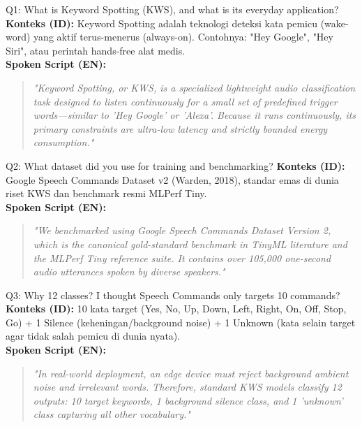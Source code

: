 \documentclass[11pt,a4paper]{article}
\begin{document}
\begin{easybox}{Q1: What is Keyword Spotting (KWS), and what is its everyday application?}
\textbf{Konteks (ID):} Keyword Spotting adalah teknologi deteksi kata pemicu (wake-word) yang aktif terus-menerus (always-on). Contohnya: "Hey Google", "Hey Siri", atau perintah hands-free alat medis.\\
\textbf{Spoken Script (EN):}
\begin{quote}
\small
\textit{"Keyword Spotting, or KWS, is a specialized lightweight audio classification task designed to listen continuously for a small set of predefined trigger words---similar to 'Hey Google' or 'Alexa'. Because it runs continuously, its primary constraints are ultra-low latency and strictly bounded energy consumption."}
\end{quote}
\end{easybox}

\begin{easybox}{Q2: What dataset did you use for training and benchmarking?}
\textbf{Konteks (ID):} Google Speech Commands Dataset v2 (Warden, 2018), standar emas di dunia riset KWS dan benchmark resmi MLPerf Tiny.\\
\textbf{Spoken Script (EN):}
\begin{quote}
\small
\textit{"We benchmarked using Google Speech Commands Dataset Version 2, which is the canonical gold-standard benchmark in TinyML literature and the MLPerf Tiny reference suite. It contains over 105,000 one-second audio utterances spoken by diverse speakers."}
\end{quote}
\end{easybox}

\begin{easybox}{Q3: Why 12 classes? I thought Speech Commands only targets 10 commands?}
\textbf{Konteks (ID):} 10 kata target (Yes, No, Up, Down, Left, Right, On, Off, Stop, Go) + 1 Silence (keheningan/background noise) + 1 Unknown (kata selain target agar tidak salah pemicu di dunia nyata).\\
\textbf{Spoken Script (EN):}
\begin{quote}
\small
\textit{"In real-world deployment, an edge device must reject background ambient noise and irrelevant words. Therefore, standard KWS models classify 12 outputs: 10 target keywords, 1 background silence class, and 1 'unknown' class capturing all other vocabulary."}
\end{quote}
\end{easybox}
\end{document}
